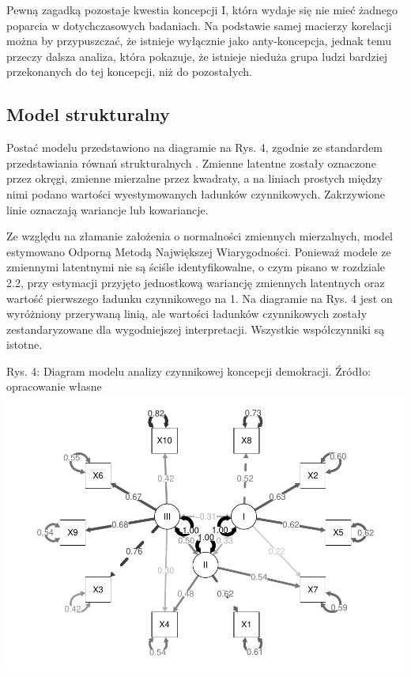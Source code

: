 \documentclass[12pt]{article}
\begin{document}
Pewną zagadką pozostaje kwestia koncepcji I, która wydaje się nie mieć żadnego poparcia w dotychczasowych badaniach. Na podstawie samej macierzy korelacji można by przypuszczać, że istnieje wyłącznie jako anty-koncepcja, jednak temu przeczy dalsza analiza, która pokazuje, że istnieje nieduża grupa ludzi bardziej przekonanych do tej koncepcji, niż do pozostałych.

\hypertarget{model-strukturalny}{%
\subsection{Model strukturalny}\label{model-strukturalny}}

Postać modelu przedstawiono na diagramie na Rys. 4, zgodnie ze standardem przedstawiania równań strukturalnych \citep{Everitt}. Zmienne latentne zostały oznaczone przez okręgi, zmienne mierzalne przez kwadraty, a na liniach prostych między nimi podano wartości wyestymowanych ładunków czynnikowych. Zakrzywione linie oznaczają wariancje lub kowariancje.

Ze względu na złamanie założenia o normalności zmiennych mierzalnych, model estymowano Odporną Metodą Największej Wiarygodności. Ponieważ modele ze zmiennymi latentnymi nie są ściśle identyfikowalne, o czym pisano w rozdziale 2.2, przy estymacji przyjęto jednostkową wariancję zmiennych latentnych oraz wartość pierwszego ładunku czynnikowego na 1. Na diagramie na Rys. 4 jest on wyróżniony przerywaną linią, ale wartości ładunków czynnikowych zostały zestandaryzowane dla wygodniejszej interpretacji. Wszystkie współczynniki są istotne.

Rys. 4: Diagram modelu analizy czynnikowej koncepcji demokracji. Źródło: opracowanie własne
\includegraphics{text_ASA_files/figure-latex/diagram-all-1.pdf}
\end{document}
